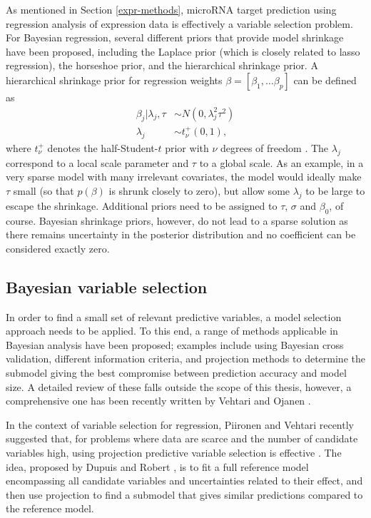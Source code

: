 As mentioned in Section \ref{expr-methods}, microRNA target prediction using
regression analysis of expression data is effectively a variable selection
problem. For Bayesian regression, several different priors that provide model shrinkage
have been proposed, including the Laplace prior (which is closely related to
lasso regression), the horseshoe prior, and the hierarchical shrinkage prior.
A hierarchical shrinkage prior for regression weights
$\beta = [\beta_1, \dotsc \beta_p]$ can be defined as
\begin{subequations}
  \begin{align}
    \beta_j | \lambda_j, \tau & \sim N(0, \lambda_j^2 \tau^2) \\
    \lambda_j                 & \sim t_\nu^+(0,1),
  \end{align}
\end{subequations}
where $t_\nu^+$ denotes the half-Student-$t$ prior with $\nu$ degrees of freedom
\citep{Piironen2015}. The $\lambda_j$ correspond to a local scale parameter and
$\tau$ to a global scale. As an example, in a very sparse model with many irrelevant
covariates, the model would ideally make $\tau$ small (so that $p(\beta)$ is shrunk
closely to zero), but allow some $\lambda_j$ to be large to escape the shrinkage.
Additional priors need to be assigned to $\tau$, $\sigma$ and $\beta_0$, of course.
Bayesian shrinkage priors, however, do not lead to a sparse solution as there remains
uncertainty in the posterior distribution and no coefficient can be considered
exactly zero.


\subsection{Bayesian variable selection}

In order to find a small set of relevant predictive variables, a model
selection approach needs to be applied. To this end, a range of methods
applicable in Bayesian analysis have been proposed; examples include using
Bayesian cross validation, different information criteria, and projection
methods to determine the submodel giving the best compromise between
prediction accuracy and model size. A detailed review of these falls outside
the scope of this thesis, however, a comprehensive one has been recently
written by Vehtari and Ojanen
\citep{Vehtari2012}.

In the context of variable selection for regression,
Piironen and Vehtari recently suggested that, for problems where data
are scarce and the number of candidate variables high, using projection predictive
variable selection is effective \citep{Piironen2016}. The idea, proposed by
Dupuis and Robert \citep{Dupuis2003}, is to fit a full reference model
encompassing all candidate variables and uncertainties related to their
effect, and then use projection to find a submodel that gives similar
predictions compared to the reference model.

